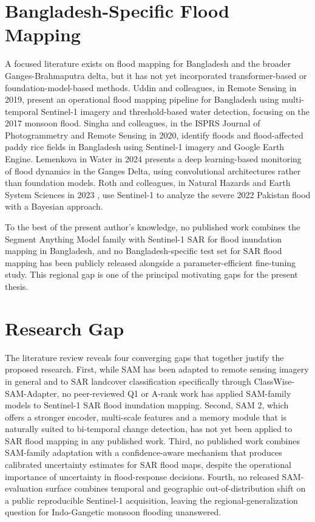 \documentclass[11pt,a4paper,oneside]{report}
\begin{document}
\section{Bangladesh-Specific Flood Mapping}

{\sloppy A focused literature exists on flood mapping for Bangladesh and the broader Ganges-Brahmaputra delta, but it has not yet incorporated transformer-based or foundation-model-based methods. Uddin and colleagues, in Remote Sensing in 2019, present an operational flood mapping pipeline for Bangladesh using multi-temporal Sentinel-1 imagery and threshold-based water detection, focusing on the 2017 monsoon flood. Singha and colleagues, in the ISPRS Journal of Photogrammetry and Remote Sensing in 2020, identify floods and flood-affected paddy rice fields in Bangladesh using Sentinel-1 imagery and Google Earth Engine. Lemenkova in Water in 2024 \cite{Lemenkova2024Ganges} presents a deep learning-based monitoring of flood dynamics in the Ganges Delta, using convolutional architectures rather than foundation models. Roth and colleagues, in Natural Hazards and Earth System Sciences in 2023 \cite{Roth2023Pakistan}, use Sentinel-1 to analyze the severe 2022 Pakistan flood with a Bayesian approach.\par}

To the best of the present author's knowledge, no published work combines the Segment Anything Model family with Sentinel-1 SAR for flood inundation mapping in Bangladesh, and no Bangladesh-specific test set for SAR flood mapping has been publicly released alongside a parameter-efficient fine-tuning study. This regional gap is one of the principal motivating gaps for the present thesis.

\section{Research Gap}

The literature review reveals four converging gaps that together justify the proposed research. First, while SAM has been adapted to remote sensing imagery in general and to SAR landcover classification specifically through ClassWise-SAM-Adapter, no peer-reviewed Q1 or A-rank work has applied SAM-family models to Sentinel-1 SAR flood inundation mapping. Second, SAM 2, which offers a stronger encoder, multi-scale features and a memory module that is naturally suited to bi-temporal change detection, has not yet been applied to SAR flood mapping in any published work. Third, no published work combines SAM-family adaptation with a confidence-aware mechanism that produces calibrated uncertainty estimates for SAR flood maps, despite the operational importance of uncertainty in flood-response decisions. Fourth, no released SAM-evaluation surface combines temporal and geographic out-of-distribution shift on a public reproducible Sentinel-1 acquisition, leaving the regional-generalization question for Indo-Gangetic monsoon flooding unanswered.
\end{document}
